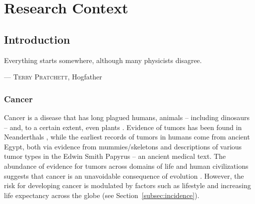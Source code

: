 \documentclass[11pt]{book}
\begin{document}
\newpage
\thispagestyle{empty}
\listoffigures
\listoftables


\mainmatter           %
\setcounter{table}{0} %



%
%
\part{Research Context}



\setcounter{page}{1}  %
\chapter{Introduction}

\epigraph{Everything starts somewhere, although many physicists disagree.}{--- \textsc{Terry Pratchett}\small\textnormal{, Hogfather}}

\section{Cancer}

Cancer is a disease that has long plagued humans, animals \cite{Murchison:2014} -- including dinosaurs \cite{Ekhtiari:2020} -- and, to a certain extent, even plants \cite{Lee:2009, MacGregor:1971}. Evidence of tumors has been found in Neanderthals \cite{Monge:2013}, while the earliest records of tumors in humans come from ancient Egypt, both via evidence from mummies/skeletons \cite{Zink:1999, Nerlich:2006, Binder:2014} and descriptions of various tumor types in the Edwin Smith Papyrus -- an ancient medical text. The abundance of evidence for tumors across domains of life and human civilizations suggests that cancer is an unavoidable consequence of evolution \cite{Domazet-Loso:2014}. However, the risk for developing cancer is modulated by factors such as lifestyle and increasing life expectancy across the globe (see Section~\ref{subsec:incidence}).
\end{document}
